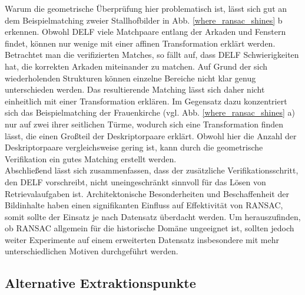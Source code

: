 Warum die geometrische Überprüfung hier problematisch ist, lässt sich gut an dem Beispielmatching zweier Stallhofbilder in Abb. \ref{where_ransac_shines} b erkennen. Obwohl DELF viele Matchpaare entlang der Arkaden und Fenstern findet, können nur wenige mit einer affinen Transformation erklärt werden. Betrachtet man die verifizierten Matches, so fällt auf, dass DELF Schwierigkeiten hat, die korrekten Arkaden miteinander zu matchen. Auf Grund der sich wiederholenden Strukturen können einzelne Bereiche nicht klar genug unterschieden werden. Das resultierende Matching lässt sich daher nicht einheitlich mit einer Transformation erklären. Im Gegensatz dazu konzentriert sich das Beispielmatching der Frauenkirche (vgl. Abb. \ref{where_ransac_shines} a) nur auf zwei ihrer seitlichen Türme, wodurch sich eine Transformation finden lässt, die einen Großteil der Deskriptorpaare erklärt. Obwohl hier die Anzahl der Deskriptorpaare vergleichsweise gering ist, kann durch die geometrische Verifikation ein gutes Matching erstellt werden.
\\
Abschließend lässt sich zusammenfassen, dass der zusätzliche Verifikationsschritt, den DELF vorschreibt, nicht uneingeschränkt sinnvoll für das Lösen von Retrievalaufgaben ist. Architektonische Besonderheiten und Beschaffenheit der Bildinhalte haben einen signifikanten Einfluss auf Effektivität von RANSAC, somit sollte der Einsatz je nach Datensatz überdacht werden. Um herauszufinden, ob RANSAC allgemein für die historische Domäne ungeeignet ist, sollten jedoch weiter Experimente auf einem erweiterten Datensatz insbesondere mit mehr unterschiedlichen Motiven durchgeführt werden.


\subsection{Alternative Extraktionspunkte}

